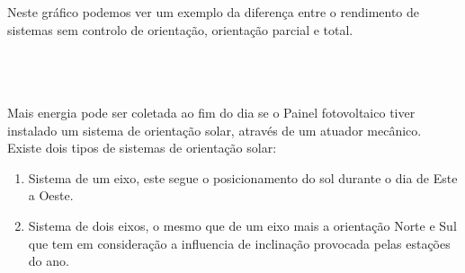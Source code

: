 \hspace{0.2cm}
\begin{minipage}[!t]{0.5\linewidth}
\flushleft
 Neste gráfico podemos ver um exemplo da diferença entre o rendimento de sistemas sem controlo de orientação, orientação parcial e total.\\
\vspace{7cm}
\end{minipage}\\
\\
\\
Mais energia pode ser coletada ao fim do dia se o Painel fotovoltaico tiver instalado um sistema de orientação solar, através de um atuador mecânico.\\
Existe dois tipos de sistemas de orientação solar:\cite{book_2}
\begin{enumerate}
	\setlength\itemsep{-0.1em}
	\item Sistema de um eixo, este segue o posicionamento do sol durante o dia de Este a Oeste.
	\item Sistema de dois eixos, o mesmo que de um eixo mais a orientação Norte e Sul que tem  em consideração a influencia de inclinação provocada pelas estações do ano.
\end{enumerate}
